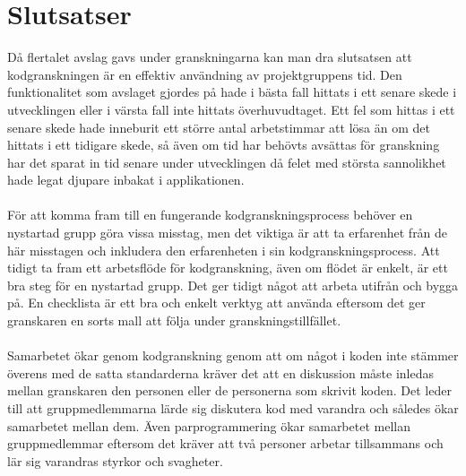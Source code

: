 \section{Slutsatser}
\label{cha:victor-conclusion}
Då flertalet avslag gavs under granskningarna kan man dra slutsatsen att kodgranskningen är en effektiv användning av projektgruppens tid. Den funktionalitet som avslaget gjordes på hade i bästa fall hittats i ett senare skede i utvecklingen eller i värsta fall inte hittats överhuvudtaget. Ett fel som hittas i ett senare skede hade inneburit ett större antal arbetstimmar att lösa än om det hittats i ett tidigare skede, så även om tid har behövts avsättas för granskning har det sparat in tid senare under utvecklingen då felet med största sannolikhet hade legat djupare inbakat i applikationen.
\\ \\
För att komma fram till en fungerande kodgranskningsprocess behöver en nystartad grupp göra vissa misstag, men det viktiga är att ta erfarenhet från de här misstagen och inkludera den erfarenheten i sin kodgranskningsprocess. Att tidigt ta fram ett arbetsflöde för kodgranskning, även om flödet är enkelt, är ett bra steg för en nystartad grupp. Det ger tidigt något att arbeta utifrån och bygga på. En checklista är ett bra och enkelt verktyg att använda eftersom det ger granskaren en sorts mall att följa under granskningstillfället.
\\ \\
Samarbetet ökar genom kodgranskning genom att om något i koden inte stämmer överens med de satta standarderna kräver det att en diskussion måste inledas mellan granskaren den personen eller de personerna som skrivit koden. Det leder till att gruppmedlemmarna lärde sig diskutera kod med varandra och således ökar samarbetet mellan dem. Även parprogrammering ökar samarbetet mellan gruppmedlemmar eftersom det kräver att två personer arbetar tillsammans och lär sig varandras styrkor och svagheter.